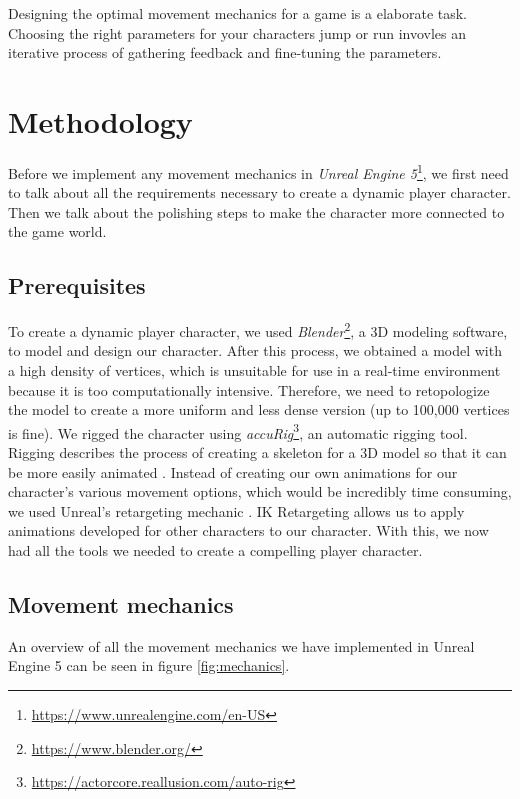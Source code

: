 \documentclass[conference]{IEEEtran}
\begin{document}
Designing the optimal movement mechanics for a game is a elaborate task. 
Choosing the right parameters for your characters jump or run invovles an iterative process of gathering feedback and fine-tuning the parameters.


\section{Methodology}
\label{Sec:Methodology}

Before we implement any movement mechanics in \textit{Unreal Engine 5}\footnote{\url{https://www.unrealengine.com/en-US}}, we first need to talk about all the requirements necessary to create a dynamic player character.
Then we talk about the polishing steps to make the character more connected to the game world.

\subsection{Prerequisites}

To create a dynamic player character, we used \textit{Blender}\footnote{\url{https://www.blender.org/}}, a 3D modeling software, to model and design our character.
After this process, we obtained a model with a high density of vertices, which is unsuitable for use in a real-time environment because it is too computationally intensive.
Therefore, we need to retopologize the model to create a more uniform and less dense version (up to 100,000 vertices is fine).
We rigged the character using \textit{accuRig}\footnote{\url{https://actorcore.reallusion.com/auto-rig}}, an automatic rigging tool.
Rigging describes the process of creating a skeleton for a 3D model so that it can be more easily animated \cite{rigging}.
Instead of creating our own animations for our character's various movement options, which would be incredibly time consuming, we used Unreal's retargeting mechanic \cite{retarget}.
IK Retargeting allows us to apply animations developed for other characters to our character.
With this, we now had all the tools we needed to create a compelling player character.

\subsection{Movement mechanics}

An overview of all the movement mechanics we have implemented in Unreal Engine 5 can be seen in figure \ref{fig:mechanics}.
\end{document}
